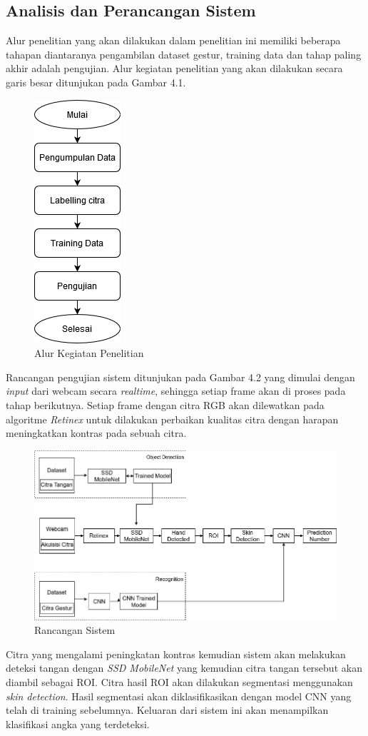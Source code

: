 \subsection{Analisis dan Perancangan Sistem}
Alur penelitian yang akan dilakukan dalam penelitian ini memiliki beberapa tahapan diantaranya pengambilan dataset gestur, training data dan tahap paling akhir adalah pengujian. Alur kegiatan penelitian yang akan dilakukan secara garis besar ditunjukan pada Gambar 4.1.
\begin{figure}[H]
	\centering
	\includegraphics[width=0.2\linewidth]{Rencana}
	\caption{Alur Kegiatan Penelitian}
	\label{fig:screenshot006}
\end{figure}
Rancangan pengujian sistem ditunjukan pada Gambar 4.2 yang dimulai dengan \emph{input} dari webcam secara \emph{realtime}, sehingga setiap frame akan di proses pada tahap berikutnya.
Setiap frame dengan citra RGB akan dilewatkan pada algoritme \emph{Retinex} untuk dilakukan perbaikan kualitas citra dengan harapan meningkatkan kontras pada sebuah citra.
\begin{figure}[H]
	\centering
	\includegraphics[width=1.1\linewidth]{rancanganedit}
	\caption{Rancangan Sistem}
	\label{fig:rancangan}
\end{figure}
\noindent Citra yang mengalami peningkatan kontras kemudian sistem akan melakukan deteksi tangan dengan \emph{SSD MobileNet} yang kemudian citra tangan tersebut akan diambil sebagai ROI. 
Citra hasil ROI akan dilakukan segmentasi menggunakan \emph{skin detection}. Hasil segmentasi akan diklasifikasikan dengan model CNN yang telah di training sebelumnya.
Keluaran dari sistem ini akan menampilkan klasifikasi angka yang terdeteksi.

